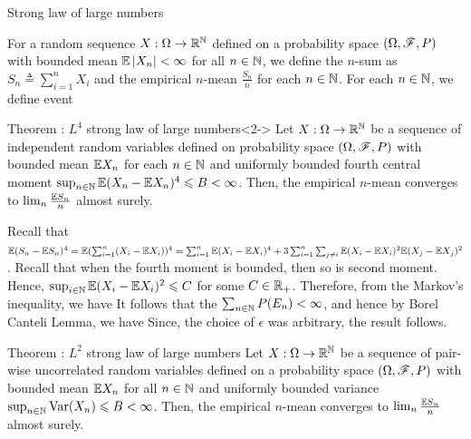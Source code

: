 \documentclass[12pt,aspectratio=169]{beamer}
\begin{document}
\begin{frame}{Strong law of large numbers}
\begin{Definition} 
For a random sequence $X:\Omega\to\mathbb{R}^{\mathbb{N}}$ defined on a probability space $(\Omega,\mathscr{F},P)$ with bounded mean $\mathbb{E}\left\lvert X_n\right\rvert < \infty$ for all $n \in \mathbb{N}$, 
we define the $n$-sum as $S_n \triangleq \sum_{i=1}^nX_i$ and the empirical $n$-mean $\frac{S_n}{n}$ for each $n \in \mathbb{N}$. 
For each $n \in \mathbb{N}$, we define event 
\end{Definition}
\begin{block}{Theorem : $L^4$ strong law of large numbers}<2->
Let $X:\Omega\to\mathbb{R}^{\mathbb{N}}$ be a sequence of independent random variables defined on probability space $(\Omega,\mathscr{F},P)$ with bounded mean $\mathbb{E} X_n$ for each $n \in \mathbb{N}$ and uniformly bounded fourth central moment $\sup_{n \in \mathbb{N}}\mathbb{E}(X_n-\mathbb{E} X_n)^4 \leqslant B < \infty$. %
Then, the empirical $n$-mean converges to $\lim_n\frac{\mathbb{E} S_n}{n}$ almost surely.
\end{block}
\end{frame}
\begin{frame}
\begin{Proof}
Recall that $\mathbb{E}(S_n-\mathbb{E} S_n)^4 = \mathbb{E}(\sum_{i=1}^n(X_i-\mathbb{E} X_i))^4 = \sum_{i=1}^n\mathbb{E}(X_i-\mathbb{E} X_i)^4 + 3\sum_{i=1}^n\sum_{j \neq i}\mathbb{E}(X_i-\mathbb{E} X_i)^2\mathbb{E}(X_j-\mathbb{E} X_j)^2$. 
Recall that when the fourth moment is bounded, then so is second moment. 
Hence, $\sup_{i\in \mathbb{N}}\mathbb{E}(X_i-\mathbb{E} X_i)^2 \leqslant C$ for some $C \in \mathbb{R}_+$.
Therefore, from the Markov's inequality, we have %
It follows that the $\sum_{n \in \mathbb{N}}P(E_n) < \infty$, and hence by Borel Canteli Lemma, we have 
Since, the choice of $\epsilon$ was arbitrary, the result follows.
\end{Proof}
\end{frame}
\begin{frame}
\begin{block}{Theorem : $L^2$ strong law of large numbers} 
Let $X:\Omega \to \mathbb{R}^{\mathbb{N}}$ be a sequence of pair-wise uncorrelated random variables defined on a probability space $(\Omega, \mathscr{F}, P)$ with bounded mean $\mathbb{E} X_n$ for all $n \in \mathbb{N}$ and uniformly bounded variance $\sup_{n\in\mathbb{N}}\operatorname{Var}(X_n) \leqslant B < \infty$. %
Then, the empirical $n$-mean converges to $\lim_n\frac{\mathbb{E} S_n}{n}$ almost surely.
\end{block}
\end{frame}
\end{document}

